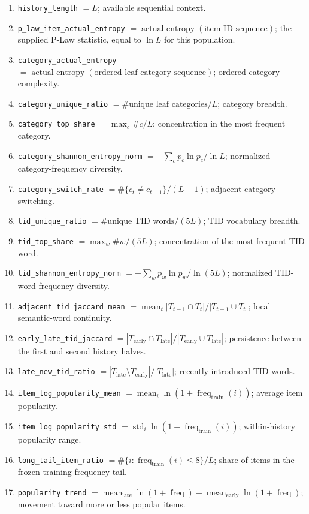 \begingroup\footnotesize
{}
\begin{enumerate}[leftmargin=*,itemsep=1.5pt,topsep=3pt,label=\textcolor{promptblue}{\arabic*.}]
\item \texttt{history\_length} $=L$; available sequential context.
\item \texttt{p\_law\_item\_actual\_entropy} $=\operatorname{actual\_entropy}(\text{item-ID sequence})$; the supplied P-Law statistic, equal to $\ln L$ for this population.
\item \texttt{category\_actual\_entropy} $=\operatorname{actual\_entropy}(\text{ordered leaf-category sequence})$; ordered category complexity.
\item \texttt{category\_unique\_ratio} $=\#\text{unique leaf categories}/L$; category breadth.
\item \texttt{category\_top\_share} $=\max_c \#c/L$; concentration in the most frequent category.
\item \texttt{category\_shannon\_entropy\_norm} $=-\sum_c p_c\ln p_c/\ln L$; normalized category-frequency diversity.
\item \texttt{category\_switch\_rate} $=\#\{c_t\neq c_{t-1}\}/(L-1)$; adjacent category switching.
\item \texttt{tid\_unique\_ratio} $=\#\text{unique TID words}/(5L)$; TID vocabulary breadth.
\item \texttt{tid\_top\_share} $=\max_w \#w/(5L)$; concentration of the most frequent TID word.
\item \texttt{tid\_shannon\_entropy\_norm} $=-\sum_w p_w\ln p_w/\ln(5L)$; normalized TID-word frequency diversity.
\item \texttt{adjacent\_tid\_jaccard\_mean} $=\operatorname{mean}_t |T_{t-1}\cap T_t|/|T_{t-1}\cup T_t|$; local semantic-word continuity.
\item \texttt{early\_late\_tid\_jaccard} $=|T_{\mathrm{early}}\cap T_{\mathrm{late}}|/|T_{\mathrm{early}}\cup T_{\mathrm{late}}|$; persistence between the first and second history halves.
\item \texttt{late\_new\_tid\_ratio} $=|T_{\mathrm{late}}\setminus T_{\mathrm{early}}|/|T_{\mathrm{late}}|$; recently introduced TID words.
\item \texttt{item\_log\_popularity\_mean} $=\operatorname{mean}_i\ln(1+\operatorname{freq}_{\mathrm{train}}(i))$; average item popularity.
\item \texttt{item\_log\_popularity\_std} $=\operatorname{std}_i\ln(1+\operatorname{freq}_{\mathrm{train}}(i))$; within-history popularity range.
\item \texttt{long\_tail\_item\_ratio} $=\#\{i:\operatorname{freq}_{\mathrm{train}}(i)\leq 8\}/L$; share of items in the frozen training-frequency tail.
\item \texttt{popularity\_trend} $=\operatorname{mean}_{\mathrm{late}}\ln(1+\operatorname{freq})-\operatorname{mean}_{\mathrm{early}}\ln(1+\operatorname{freq})$; movement toward more or less popular items.
\end{enumerate}

